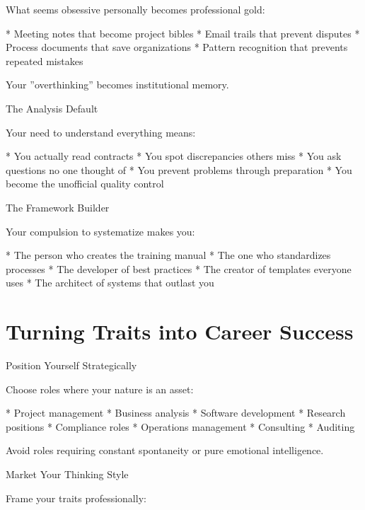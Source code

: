 \documentclass[12pt,oneside]{book}
\begin{document}
What seems obsessive personally becomes professional gold:

                    * Meeting notes that become project bibles
                    * Email trails that prevent disputes
                    * Process documents that save organizations
                    * Pattern recognition that prevents repeated mistakes

Your ''overthinking'' becomes institutional memory.

                The Analysis Default
                
Your need to understand everything means:

                    * You actually read contracts
                    * You spot discrepancies others miss
                    * You ask questions no one thought of
                    * You prevent problems through preparation
                    * You become the unofficial quality control

                The Framework Builder
                
Your compulsion to systematize makes you:

                    * The person who creates the training manual
                    * The one who standardizes processes
                    * The developer of best practices
                    * The creator of templates everyone uses
                    * The architect of systems that outlast you

\section{Turning Traits into Career Success}

                Position Yourself Strategically
                
Choose roles where your nature is an asset:

                    * Project management
                    * Business analysis
                    * Software development
                    * Research positions
                    * Compliance roles
                    * Operations management
                    * Consulting
                    * Auditing

Avoid roles requiring constant spontaneity or pure emotional intelligence.

                Market Your Thinking Style
                
Frame your traits professionally:
\end{document}
